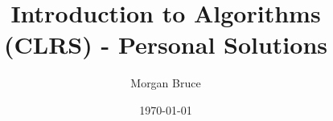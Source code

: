 \documentclass[a4paper,12pt]{book}
\begin{document}
\author{Morgan Bruce}
\title{Introduction to Algorithms (CLRS) - Personal Solutions}
\date{\today}

\frontmatter
\maketitle
\tableofcontents

\mainmatter





\backmatter
\end{document}
